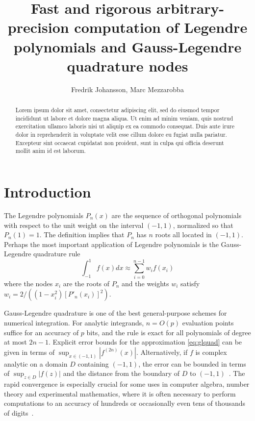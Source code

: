 \documentclass[11pt,a4paper]{article}
\begin{document}
\title{Fast and rigorous arbitrary-precision computation of Legendre polynomials and Gauss-Legendre quadrature nodes}
\author{Fredrik Johansson, Marc Mezzarobba}
\date{}
\maketitle

\begin{abstract}
Lorem ipsum dolor sit amet, consectetur adipiscing elit, sed do eiusmod tempor incididunt ut labore et dolore magna aliqua. Ut enim ad minim veniam, quis nostrud exercitation ullamco laboris nisi ut aliquip ex ea commodo consequat. Duis aute irure dolor in reprehenderit in voluptate velit esse cillum dolore eu fugiat nulla pariatur. Excepteur sint occaecat cupidatat non proident, sunt in culpa qui officia deserunt mollit anim id est laborum.
\end{abstract}

\section{Introduction}

The Legendre polynomials $P_n(x)$ are the sequence
of orthogonal polynomials with respect to the unit weight
on the interval $(-1,1)$, normalized so that $P_n(1) = 1$.
The definition implies that $P_n$ has $n$ roots all located in $(-1,1)$.
Perhaps the most important application of Legendre polynomials
is the Gauss-Legendre quadrature rule
\begin{equation}
\int_{-1}^{1} f(x) dx \approx \sum_{i=0}^{n-1} w_i f(x_i)
\label{eq:glquad}
\end{equation}
where the nodes $x_i$ are the roots of $P_n$
and the weights $w_i$ satisfy $w_i = 2 / ((1-x_i^2) [P'_n(x_i)]^2)$.

Gauss-Legendre quadrature is one of the best general-purpose
schemes for numerical integration. For analytic integrands,
$n = O(p)$ evaluation points suffice for an accuracy of $p$ bits,
and the rule is exact for all polynomials of degree at most $2n-1$.
Explicit error bounds for the approximation
\eqref{eq:glquad} can be given in terms of
$\sup_{x \in (-1,1)} |f^{(2n)}(x)|$. Alternatively,
if $f$ is complex analytic on a domain $D$ containing $(-1,1)$,
the error can be bounded in terms of $\sup_{z \in D} |f(z)|$
and the distance from the boundary of $D$ to $(-1,1)$~\cite{trefethen2008gauss}.
The rapid convergence is especially crucial
for some uses in computer algebra, number theory and experimental mathematics,
where it is often necessary to perform computations
to an accuracy of hundreds or occasionally even tens of thousands of digits~\cite{bailey2011high}.
\end{document}
